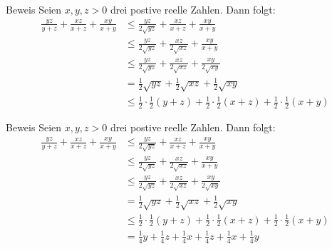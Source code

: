 \documentclass[10pt]{beamer}
\begin{document}
\begin{frame}{Beweis}
    Seien \( x, y, z > 0 \) drei postive reelle Zahlen. Dann folgt:
    \begin{align*}
        \frac{yz}{y + z} + \frac{xz}{x + z} + \frac{xy}{x + y}
        & \leq \frac{yz}{2\sqrt{yz}} + \frac{xz}{x + z} + \frac{xy}{x + y} \\
        & \leq \frac{yz}{2\sqrt{yz}} + \frac{xz}{2\sqrt{xz}} + \frac{xy}{x + y} \\
        & \leq \frac{yz}{2\sqrt{yz}} + \frac{xz}{2\sqrt{xz}} + \frac{xy}{2\sqrt{xy}} \\
        & = \frac{1}{2}\sqrt{yz} + \frac{1}{2}\sqrt{xz} + \frac{1}{2}\sqrt{xy} \\
        & \leq \frac{1}{2} \cdot \frac{1}{2} \left( y + z \right) + \frac{1}{2} \cdot \frac{1}{2} \left( x + z \right) + \frac{1}{2} \cdot \frac{1}{2} \left( x + y \right)
    \end{align*}
\end{frame}



\begin{frame}{Beweis}
    Seien \( x, y, z > 0 \) drei postive reelle Zahlen. Dann folgt:
    \begin{align*}
        \frac{yz}{y + z} + \frac{xz}{x + z} + \frac{xy}{x + y}
        & \leq \frac{yz}{2\sqrt{yz}} + \frac{xz}{x + z} + \frac{xy}{x + y} \\
        & \leq \frac{yz}{2\sqrt{yz}} + \frac{xz}{2\sqrt{xz}} + \frac{xy}{x + y} \\
        & \leq \frac{yz}{2\sqrt{yz}} + \frac{xz}{2\sqrt{xz}} + \frac{xy}{2\sqrt{xy}} \\
        & = \frac{1}{2}\sqrt{yz} + \frac{1}{2}\sqrt{xz} + \frac{1}{2}\sqrt{xy} \\
        & \leq \frac{1}{2} \cdot \frac{1}{2} \left( y + z \right) + \frac{1}{2} \cdot \frac{1}{2} \left( x + z \right) + \frac{1}{2} \cdot \frac{1}{2} \left( x + y \right) \\
        & = \frac{1}{4}y + \frac{1}{4}z + \frac{1}{4}x + \frac{1}{4}z + \frac{1}{4}x + \frac{1}{4}y
    \end{align*}
\end{frame}
\end{document}
